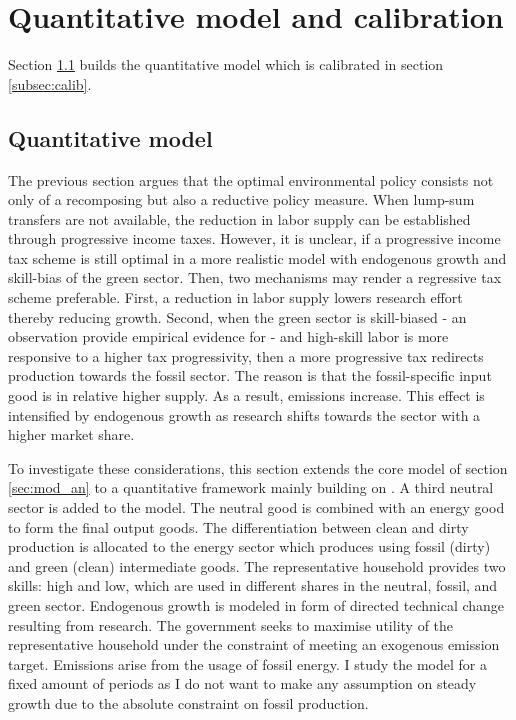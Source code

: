 \section{Quantitative model and calibration}\label{sec:model}
Section \ref{subsec:quantmod} builds the quantitative model which is calibrated in section \ref{subsec:calib}.

\subsection{Quantitative model}\label{subsec:quantmod}
The previous section argues that the optimal environmental policy consists not only of a recomposing but also a reductive policy measure. When lump-sum transfers are not available, the reduction in labor supply can be established through progressive income taxes. 
 However, it is unclear, if a progressive income tax scheme is still optimal in a more realistic model with endogenous growth and skill-bias of the green sector. Then, two mechanisms may render a regressive tax scheme preferable. First, a reduction in labor supply lowers research effort thereby reducing growth. Second, when the green sector is skill-biased - an observation \cite{Consoli2016DoCapital} provide empirical evidence for - and high-skill labor is more responsive to a higher tax progressivity, then a more progressive tax redirects production towards the fossil sector. The reason is that the fossil-specific input good is in relative higher supply. As a result, emissions increase. This effect is intensified by endogenous growth as research shifts towards the sector with a higher market share.

To investigate these considerations, this section extends the core model of section \ref{sec:mod_an} to a quantitative framework mainly building on \cite{Fried2018ClimateAnalysis}.
A third neutral sector is added to the model. The neutral good is combined with an energy good to form  the final output goods. The differentiation between clean and dirty production is allocated to the energy sector which produces using fossil (dirty) and green (clean) intermediate goods.
The representative household provides two skills: high and low, which are used in different shares in the neutral, fossil, and green sector. 
Endogenous growth is modeled in form of directed technical change resulting from research. The government seeks to maximise utility of the representative household under the constraint of meeting an exogenous emission target. Emissions arise from the usage of fossil energy.
I study the model for a fixed amount of periods as I do not want to make any assumption on steady growth due to the absolute constraint on fossil production. 

